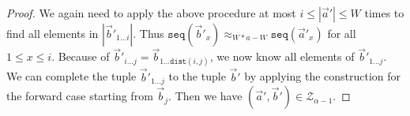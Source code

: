 \documentclass[draft]{scrartcl}
\theoremstyle{definition}
\newcommand{\seq}[1]{\mathtt{seq}({#1})}
\newcommand{\dist}[2]{\mathtt{dist}({#1},{#2})}
\newcommand{\sij}{_{i\ldots{}j}}
\begin{document}
\begin{proof}
  We again need to apply the above procedure at most $i \le |\overrightarrow{a}'| \le W$ times to find all elements in $|\overrightarrow{b}'_{1\ldots{}i}|$.
  Thus $\seq{\overrightarrow{b}'_{x}} \approx_{W*a - W} \seq{\overrightarrow{a}'_{x}}$ for all $1 \le x \le i$.
  Because of $\overrightarrow{b}'\sij = \overrightarrow{b}_{1\ldots{}\dist{i}{j}}$, we now know all elements of $\overrightarrow{b}'_{1\ldots{}j}$.
  We can complete the tuple $\overrightarrow{b}'_{1\ldots{}j}$ to the tuple $\overrightarrow{b}'$ by applying the construction for the forward case starting from $\overrightarrow{b}_{j}$.
  Then we have $(\overrightarrow{a}', \overrightarrow{b}') \in \mathcal{Z}_{\alpha-1}$.

\end{proof}
\end{document}
